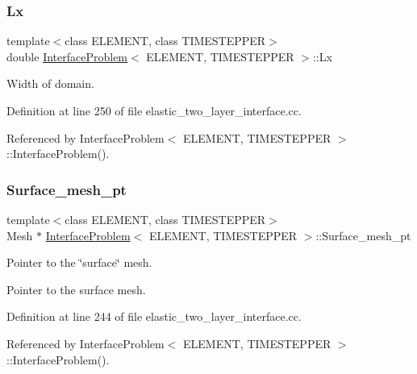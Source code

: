\subsubsection{\texorpdfstring{Lx}{Lx}}
{\footnotesize\ttfamily template$<$class E\+L\+E\+M\+E\+NT, class T\+I\+M\+E\+S\+T\+E\+P\+P\+ER$>$ \\
double \hyperlink{classInterfaceProblem}{Interface\+Problem}$<$ E\+L\+E\+M\+E\+NT, T\+I\+M\+E\+S\+T\+E\+P\+P\+ER $>$\+::Lx\hspace{0.3cm}{\ttfamily [private]}}



Width of domain. 



Definition at line 250 of file elastic\+\_\+two\+\_\+layer\+\_\+interface.\+cc.



Referenced by Interface\+Problem$<$ E\+L\+E\+M\+E\+N\+T, T\+I\+M\+E\+S\+T\+E\+P\+P\+E\+R $>$\+::\+Interface\+Problem().

\mbox{\label{classInterfaceProblem_a011c7b4f2307ff909f64dc158e8fc674}} 
\subsubsection{\texorpdfstring{Surface\+\_\+mesh\+\_\+pt}{Surface\_mesh\_pt}}
{\footnotesize\ttfamily template$<$class E\+L\+E\+M\+E\+NT, class T\+I\+M\+E\+S\+T\+E\+P\+P\+ER$>$ \\
Mesh $\ast$ \hyperlink{classInterfaceProblem}{Interface\+Problem}$<$ E\+L\+E\+M\+E\+NT, T\+I\+M\+E\+S\+T\+E\+P\+P\+ER $>$\+::Surface\+\_\+mesh\+\_\+pt\hspace{0.3cm}{\ttfamily [private]}}



Pointer to the \char`\"{}surface\char`\"{} mesh. 

Pointer to the surface mesh. 

Definition at line 244 of file elastic\+\_\+two\+\_\+layer\+\_\+interface.\+cc.



Referenced by Interface\+Problem$<$ E\+L\+E\+M\+E\+N\+T, T\+I\+M\+E\+S\+T\+E\+P\+P\+E\+R $>$\+::\+Interface\+Problem().

\mbox{\label{classInterfaceProblem_a45e3bf3b44bcbeefab21a3598bef6179}} 
